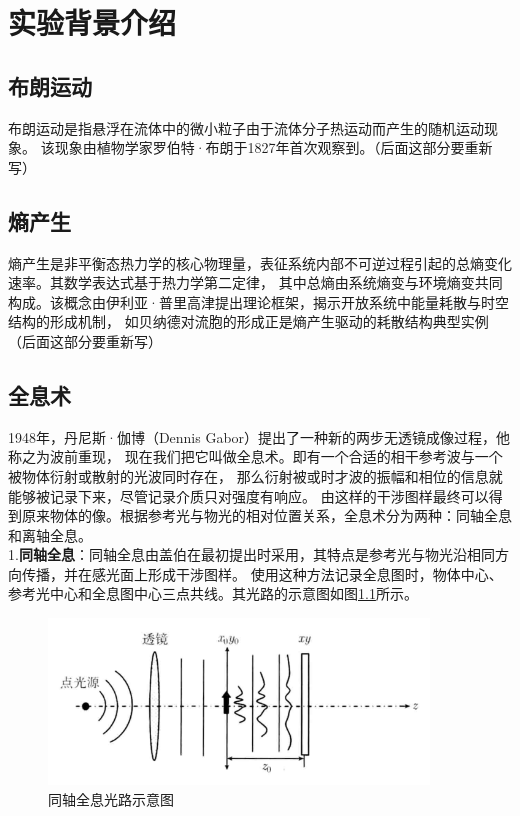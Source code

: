 \documentclass[a4paper,draft]{report}
\begin{document}
\tableofcontents

\chapter{实验背景介绍}
\section{布朗运动}
布朗运动是指悬浮在流体中的微小粒子由于流体分子热运动而产生的随机运动现象。
该现象由植物学家罗伯特·布朗于1827年首次观察到。（后面这部分要重新写）
\section{熵产生}
熵产生是非平衡态热力学的核心物理量，表征系统内部不可逆过程引起的总熵变化速率。其数学表达式基于热力学第二定律，
其中总熵由系统熵变与环境熵变共同构成。该概念由伊利亚·普里高津提出理论框架，揭示开放系统中能量耗散与时空结构的形成机制，
如贝纳德对流胞的形成正是熵产生驱动的耗散结构典型实例（后面这部分要重新写）
\section{全息术}
1948年，丹尼斯·伽博（Dennis Gabor）提出了一种新的两步无透镜成像过程，他称之为波前重现，
现在我们把它叫做全息术\cite{goodman}。即有一个合适的相干参考波与一个被物体衍射或散射的光波同时存在，
那么衍射被或时才波的振幅和相位的信息就能够被记录下来，尽管记录介质只对强度有响应。
由这样的干涉图样最终可以得到原来物体的像。根据参考光与物光的相对位置关系，全息术分为两种：同轴全息和离轴全息。\\
1.\textbf{同轴全息}：同轴全息由盖伯在最初提出时采用，其特点是参考光与物光沿相同方向传播，并在感光面上形成干涉图样。
使用这种方法记录全息图时，物体中心、参考光中心和全息图中心三点共线。其光路的示意图如图\ref{fig:tongzhoushiyi}\cite{shuzi1}所示。
\begin{figure}[H]
    \centering
    \includegraphics[width=0.9\textwidth]{同轴示意图}
    \caption{同轴全息光路示意图}
    \label{fig:tongzhoushiyi}
\end{figure}
\end{document}
